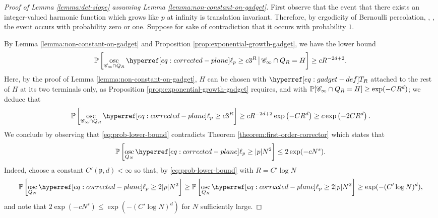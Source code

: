 \documentclass[12pt]{amsart}
\numberwithin{equation}{section}
\begin{document}
	
	\begin{proof}[Proof of Lemma \ref{lemma:det-slope} assuming Lemma \ref{lemma:non-constant-on-gadget}]
		
		First observe that the event that there exists an integer-valued harmonic function which grows like $p$ at infinity is translation invariant. Therefore, by ergodicity of Bernoulli percolation, \eg, \cite[Proposition 7.3]{lyons-peres-book}, the event occurs with probability zero or one. Suppose for sake of contradiction that it occurs with probability $1$.
		
		
		By Lemma \ref{lemma:non-constant-on-gadget} and Proposition \ref{prop:exponential-growth-gadget}, we have the lower bound
		\begin{equation*}
			\P \left[ \osc_{\mathscr{C}_\infty \cap Q_R}  \ellp{p}  \geq c 3^{R} \, \big| \, \mathscr{C}_\infty \cap Q_R = H \right] \geq c R^{-2d+2}.
		\end{equation*}
		Here, by the proof of Lemma \ref{lemma:non-constant-on-gadget}, $H$ can be chosen with $\Tn{R}$ attached to the rest of $H$ at its two terminals only, as Proposition \ref{prop:exponential-growth-gadget} requires, and with $\P[\mathscr{C}_\infty \cap Q_R = H] \geq \exp(-C R^d)$; we deduce that
		\begin{equation} \label{eq:prob-lower-bound}
			\P \left[ \osc_{\mathscr{C}_\infty \cap Q_R} \ellp{p}  \geq c 3^{R}  \right] \geq c R^{-2d+2} \exp \left( - C R^d \right)  \geq c \exp \left( - 2 C R^d \right).
		\end{equation}
		We conclude by observing that \eqref{eq:prob-lower-bound} contradicts Theorem \ref{theorem:first-order-corrector} which states that 
		\[
		\P \left[ \osc_{Q_N} \ellp{p} \geq |p| N^{2} \right] \leq 2 \exp(-c N^s).
		\] 
		Indeed, choose a constant $C'(\mathfrak{p},d) < \infty$ so that, by \eqref{eq:prob-lower-bound} with $R = C' \log N$
		\[
		\P \left[ \osc_{Q_N} \ellp{p}   \geq 2 |p| N^{2} \right] \geq 	\P\left[\osc_{Q_R} \ellp{p}  \geq 2 |p| N^{2} \right] \geq  \exp( - (C' \log N)^d),
		\]	
		and note that $2 \exp(-c N^s) \leq \exp( - (C' \log N)^d)$ for $N$ sufficiently large.
	\end{proof}
	
	
	
\end{document}

